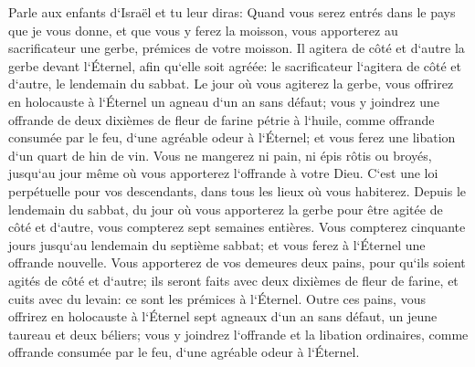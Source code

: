 \verse Parle aux enfants d`Israël et tu leur diras: Quand vous serez entrés dans le pays que je vous donne, et que vous y ferez la moisson, vous apporterez au sacrificateur une gerbe, prémices de votre moisson. 
\verse Il agitera de côté et d`autre la gerbe devant l`Éternel, afin qu`elle soit agréée: le sacrificateur l`agitera de côté et d`autre, le lendemain du sabbat. 
\verse Le jour où vous agiterez la gerbe, vous offrirez en holocauste à l`Éternel un agneau d`un an sans défaut; 
\verse vous y joindrez une offrande de deux dixièmes de fleur de farine pétrie à l`huile, comme offrande consumée par le feu, d`une agréable odeur à l`Éternel; et vous ferez une libation d`un quart de hin de vin. 
\verse Vous ne mangerez ni pain, ni épis rôtis ou broyés, jusqu`au jour même où vous apporterez l`offrande à votre Dieu. C`est une loi perpétuelle pour vos descendants, dans tous les lieux où vous habiterez. 
\verse Depuis le lendemain du sabbat, du jour où vous apporterez la gerbe pour être agitée de côté et d`autre, vous compterez sept semaines entières. 
\verse Vous compterez cinquante jours jusqu`au lendemain du septième sabbat; et vous ferez à l`Éternel une offrande nouvelle. 
\verse Vous apporterez de vos demeures deux pains, pour qu`ils soient agités de côté et d`autre; ils seront faits avec deux dixièmes de fleur de farine, et cuits avec du levain: ce sont les prémices à l`Éternel. 
\verse Outre ces pains, vous offrirez en holocauste à l`Éternel sept agneaux d`un an sans défaut, un jeune taureau et deux béliers; vous y joindrez l`offrande et la libation ordinaires, comme offrande consumée par le feu, d`une agréable odeur à l`Éternel. 
